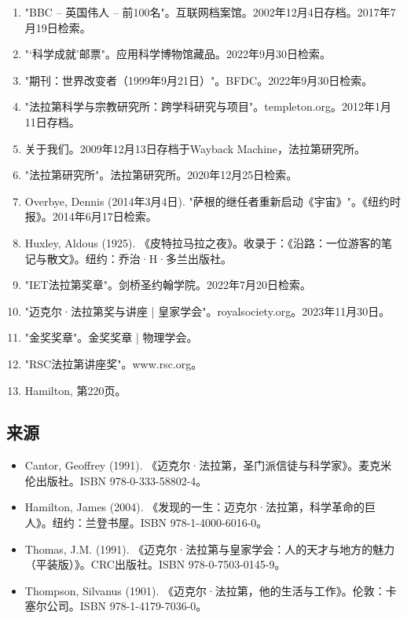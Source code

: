 \begin{enumerate}
\item "BBC – 英国伟人 – 前100名"。互联网档案馆。2002年12月4日存档。2017年7月19日检索。
\item "‘科学成就’邮票"。应用科学博物馆藏品。2022年9月30日检索。
\item "期刊：世界改变者（1999年9月21日）"。BFDC。2022年9月30日检索。
\item "法拉第科学与宗教研究所：跨学科研究与项目"。templeton.org。2012年1月11日存档。
\item 关于我们。2009年12月13日存档于Wayback Machine，法拉第研究所。
\item "法拉第研究所"。法拉第研究所。2020年12月25日检索。
\item Overbye, Dennis (2014年3月4日). "萨根的继任者重新启动《宇宙》"。《纽约时报》。2014年6月17日检索。
\item Huxley, Aldous (1925). 《皮特拉马拉之夜》。收录于：《沿路：一位游客的笔记与散文》。纽约：乔治·H·多兰出版社。
\item "IET法拉第奖章"。剑桥圣约翰学院。2022年7月20日检索。
\item "迈克尔·法拉第奖与讲座 | 皇家学会"。royalsociety.org。2023年11月30日。
\item "金奖奖章"。金奖奖章 | 物理学会。
\item "RSC法拉第讲座奖"。www.rsc.org。
\item Hamilton, 第220页。
\end{enumerate}
\subsection{来源}
\begin{itemize}
\item Cantor, Geoffrey (1991). 《迈克尔·法拉第，圣门派信徒与科学家》。麦克米伦出版社。ISBN 978-0-333-58802-4。
\item Hamilton, James (2004). 《发现的一生：迈克尔·法拉第，科学革命的巨人》。纽约：兰登书屋。ISBN 978-1-4000-6016-0。
\item Thomas, J.M. (1991). 《迈克尔·法拉第与皇家学会：人的天才与地方的魅力（平装版）》。CRC出版社。ISBN 978-0-7503-0145-9。
\item Thompson, Silvanus (1901). 《迈克尔·法拉第，他的生活与工作》。伦敦：卡塞尔公司。ISBN 978-1-4179-7036-0。
\end{itemize}